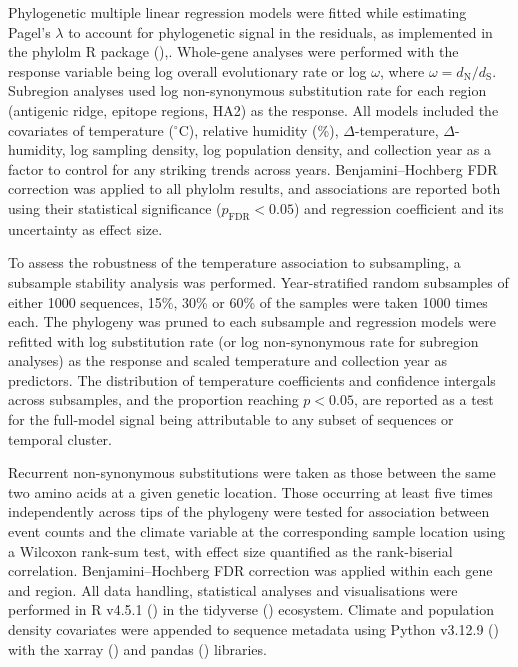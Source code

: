 \documentclass[11pt, a4paper]{article}
\begin{document}
Phylogenetic multiple linear regression models were fitted while estimating Pagel's $\lambda$ to account for phylogenetic signal in the residuals, as implemented in the phylolm R package (\cite{ho_phylolm_2020}),. Whole-gene analyses were performed with the response variable being log overall evolutionary rate or log $\omega$, where $\omega = d_\text{N} / d_\text{S}$. Subregion analyses used log non-synonymous substitution rate for each region (antigenic ridge, epitope regions, HA2) as the response. All models included the covariates of temperature ($^\circ$C), relative humidity (\%), $\Delta$-temperature, $\Delta$-humidity, log sampling density, log population density, and collection year as a factor to control for any striking trends across years. Benjamini--Hochberg FDR correction was applied to all phylolm results, and associations are reported both using their statistical significance ($p_\text{FDR} < 0.05$) and regression coefficient and its uncertainty as effect size.

To assess the robustness of the temperature association to subsampling, a subsample stability analysis was performed. Year-stratified random subsamples of either 1000 sequences, 15\%, 30\% or 60\% of the samples were taken 1000 times each. The phylogeny was pruned to each subsample and regression models were refitted with log substitution rate (or log non-synonymous rate for subregion analyses) as the response and scaled temperature and collection year as predictors. The distribution of temperature coefficients and confidence intergals across subsamples, and the proportion reaching $p < 0.05$, are reported as a test for the full-model signal being attributable to any subset of sequences or temporal cluster.

Recurrent non-synonymous substitutions were taken as those between the same two amino acids at a given genetic location. Those occurring at least five times independently across tips of the phylogeny were tested for association between event counts and the climate variable at the corresponding sample location using a Wilcoxon rank-sum test, with effect size quantified as the rank-biserial correlation. Benjamini--Hochberg FDR correction was applied within each gene and region. All data handling, statistical analyses and visualisations were performed in R v4.5.1 (\cite{r_2025}) in the tidyverse (\cite{tidyverse_2019}) ecosystem. Climate and population density covariates were appended to sequence metadata using Python v3.12.9 (\cite{vanrossum_python_2009}) with the xarray (\cite{hoyer2017xarray}) and pandas (\cite{reback2020pandas}) libraries. 
\end{document}
